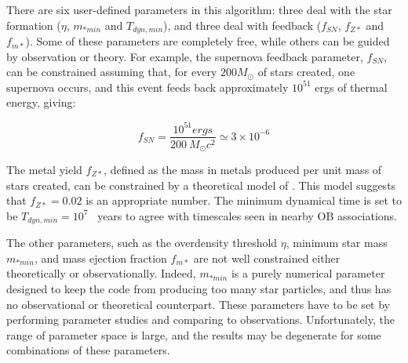 There are six user-defined parameters in this algorithm:  three deal with the
star formation ($\eta$, $m_{*min}$ and $T_{dyn,min}$), and three 
deal with feedback ($f_{SN}$, $f_{Z*}$ and $f_{m*}$).  Some of these
parameters are completely free, while others can be guided by observation
or theory.  For example, the supernova feedback parameter, $f_{SN}$, can be 
constrained assuming that, for every $200 M_\odot$ of stars created, one
supernova occurs, and this event feeds back approximately $10^{51}$ ergs of
thermal energy, giving:

\begin{equation}
f_{SN} = \frac{10^{51} ergs}{200~M_\odot c^2} \simeq 3 \times 10^{-6}
\end{equation}

The metal yield $f_{Z*}$, defined as the mass in metals produced per unit
mass of stars created, can be constrained by a theoretical model of
 \citet{1995ApJS..101..181W}.  This model suggests that $f_{Z*} = 0.02$
is an appropriate number.  The minimum dynamical time is set to be $T_{dyn,min} = 10^7$
~years to agree with timescales seen in nearby OB associations.

The other parameters, such as the overdensity threshold $\eta$, minimum star
 mass $m_{*min}$, and mass ejection fraction $f_{m*}$ are not well constrained 
either theoretically or observationally.  Indeed, $m_{*min}$ is a purely
numerical parameter designed to keep the code from producing too many star 
particles, and thus has no observational or theoretical counterpart.  These
parameters have to be set by performing parameter studies and comparing to 
observations.  Unfortunately, the range of parameter space is large, and
the results may be degenerate for some combinations of these parameters.

